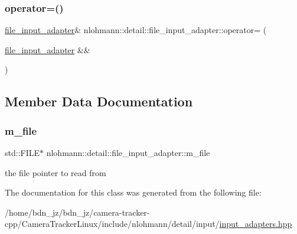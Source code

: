 \mbox{\label{classnlohmann_1_1detail_1_1file__input__adapter_a95adaec9a8c583a46083c4c493981e77}} 
\subsubsection{\texorpdfstring{operator=()}{operator=()}\hspace{0.1cm}{\footnotesize\ttfamily [2/2]}}
{\footnotesize\ttfamily \hyperlink{classnlohmann_1_1detail_1_1file__input__adapter}{file\+\_\+input\+\_\+adapter}\& nlohmann\+::detail\+::file\+\_\+input\+\_\+adapter\+::operator= (\begin{DoxyParamCaption}\item[{\hyperlink{classnlohmann_1_1detail_1_1file__input__adapter}{file\+\_\+input\+\_\+adapter} \&\&}]{ }\end{DoxyParamCaption})\hspace{0.3cm}{\ttfamily [default]}}



\subsection{Member Data Documentation}
\mbox{\label{classnlohmann_1_1detail_1_1file__input__adapter_a164fbe2739ac97e517e22bc1fff1c174}} 
\subsubsection{\texorpdfstring{m\+\_\+file}{m\_file}}
{\footnotesize\ttfamily std\+::\+F\+I\+LE$\ast$ nlohmann\+::detail\+::file\+\_\+input\+\_\+adapter\+::m\+\_\+file\hspace{0.3cm}{\ttfamily [private]}}



the file pointer to read from 



The documentation for this class was generated from the following file\+:\begin{DoxyCompactItemize}
\item 
/home/bdn\+\_\+jz/bdn\+\_\+jz/camera-\/tracker-\/cpp/\+Camera\+Tracker\+Linux/include/nlohmann/detail/input/\hyperlink{input__adapters_8hpp}{input\+\_\+adapters.\+hpp}\end{DoxyCompactItemize}
